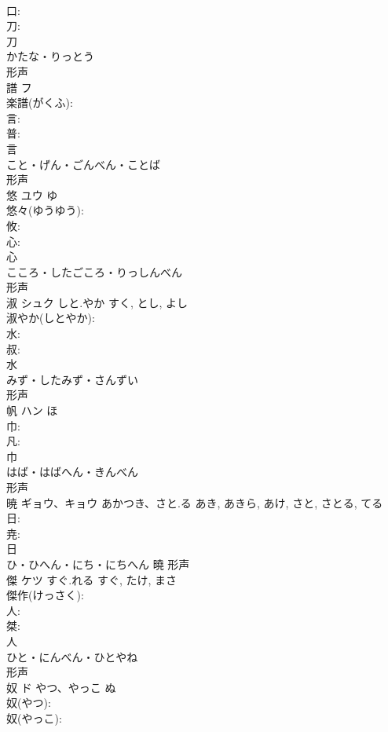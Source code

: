 \documentclass[8pt]{extreport}
\begin{document}
\begin{CJK}{UTF8}{min}
\\	口: 
\\	刀: 
\\	刀	
\\	かたな・りっとう	
\\	形声 
\\	譜	フ			
\\	楽譜(がくふ): 
\\	言: 
\\	普: 
\\	言	
\\	こと・げん・ごんべん・ことば	
\\	形声 
\\	悠	ユウ		ゆ	
\\	悠々(ゆうゆう): 
\\	攸: 
\\	心: 
\\	心	
\\	こころ・したごころ・りっしんべん	
\\	形声 
\\	淑	シュク	しと.やか	すく, とし, よし	
\\	淑やか(しとやか): 
\\	水: 
\\	叔: 
\\	水	
\\	みず・したみず・さんずい	
\\	形声 
\\	帆	ハン	ほ		
\\	巾: 
\\	凡: 
\\	巾	
\\	はば・はばへん・きんべん	
\\	形声 
\\	暁	ギョウ、キョウ	あかつき、さと.る	あき, あきら, あけ, さと, さとる, てる	
\\	日: 
\\	尭: 
\\	日	
\\	ひ・ひへん・にち・にちへん	曉	形声 
\\	傑	ケツ	すぐ.れる	すぐ, たけ, まさ	
\\	傑作(けっさく): 
\\	人: 
\\	桀: 
\\	人	
\\	ひと・にんべん・ひとやね	
\\	形声 
\\	奴	ド	やつ、やっこ	ぬ	
\\	奴(やつ): 
\\	奴(やっこ): 

\end{CJK}
\end{document}
